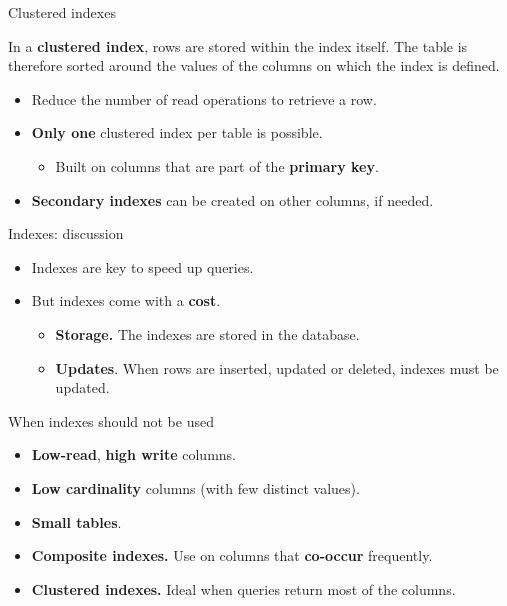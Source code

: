 \documentclass[xcolor=table]{beamer}
\begin{document}
\begin{frame}{Clustered indexes}
  \begin{definition}
    In a {\bf clustered index}, rows are stored 
    within the index itself. The table is therefore 
    sorted around the values of the columns on which the 
    index is defined.
  \end{definition}
  \vfill
  \begin{center}
  \end{center}
  \vfill
  \begin{itemize}
    \item Reduce the number of read operations to retrieve a row.
    \item {\bf Only one} clustered index per table is possible.
    \begin{itemize}
      \item Built on columns that are part of the {\bf primary key}.
    \end{itemize} 
    \item {\bf Secondary indexes} can be created on other columns, if needed.
    
  \end{itemize}
\end{frame}
  
  \begin{frame}{Indexes: discussion}
  \begin{itemize}
    \item Indexes are key to speed up queries.
    \item But indexes come with a {\bf cost}.
    \begin{itemize}
      \item \textbf{Storage.} The indexes are stored in the database.
      \item \textbf{Updates}. When rows are inserted, updated 
      or deleted, indexes must be updated.
    \end{itemize}
  \end{itemize}
  \vfill
  \begin{block}{When indexes should not be used}
    \begin{itemize}
      \item \textbf{Low-read}, \textbf{high write} columns.
      \item \textbf{Low cardinality} columns (with few distinct values).
      \item \textbf{Small tables}.  
      \end{itemize}
  \end{block}
  \vfill
  \begin{itemize}
    \item {\bf Composite indexes.} Use on columns that {\bf co-occur} frequently.
    \item {\bf Clustered indexes.} Ideal when queries return most of the columns.
  \end{itemize}
    
  \end{frame}
  
\end{document}
